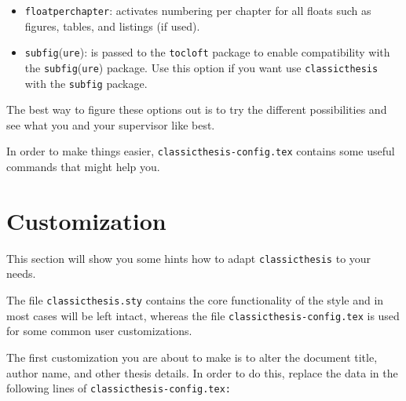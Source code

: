 \begin{itemize}
\begin{itemize}
    \item\texttt{floatperchapter}: activates numbering per chapter for
    all floats such as figures, tables, and listings (if used). 
    
        \item\texttt{subfig}(\texttt{ure}): is passed to the \texttt{tocloft} 
        package to enable compatibility with the \texttt{subfig}(\texttt{ure}) 
        package. Use this option if you want use \texttt{classicthesis} with the
        \texttt{subfig} package.
        
        \end{itemize}    
 

   \end{itemize}
The best way to figure these options out is to try the different
possibilities and see what you and your supervisor like best.

In order to make things easier, \texttt{classicthesis-config.tex} 
contains some useful commands that might help you.


\section{Customization}\label{sec:custom}
This section will show you some hints how to adapt 
\texttt{classicthesis} to your needs.

The file \texttt{classicthesis.sty}
contains the core functionality of the style and in most cases will
be left intact, whereas the file \texttt{classic\-thesis-config.tex}
is used for some common user customizations. 

The first customization you are about to make is to alter the document
title, author name, and other thesis details. In order to do this, replace
the data in the following lines of \texttt{classicthesis-config.tex:}%

